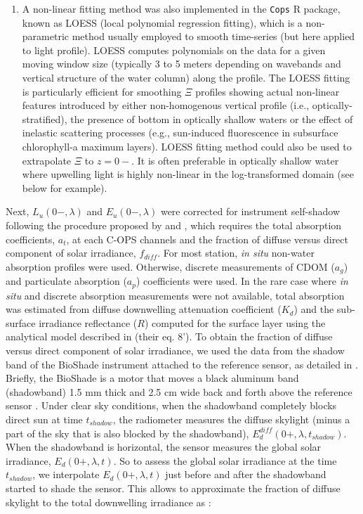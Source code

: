 \documentclass[essd, manuscript]{copernicus}
\begin{document}
\begin{enumerate}
    \item A non-linear fitting method was also implemented in the \texttt{Cops} R package, known as LOESS (local polynomial regression fitting), which is a non-parametric method usually employed to smooth time-series (but here applied to light profile). LOESS computes polynomials on the data for a given moving window size (typically 3 to 5 meters depending on wavebands and vertical structure of the water column) along the profile. The LOESS fitting is particularly efficient for smoothing $\Xi$ profiles showing actual non-linear features introduced by either non-homogenous vertical profile (i.e., optically-stratified), the presence of bottom in optically shallow waters or the effect of inelastic scattering processes (e.g., sun-induced fluorescence in subsurface chlorophyll-a maximum layers).  LOESS fitting method could also be used to extrapolate $\Xi$ to $z=0-$. It is often preferable in optically shallow water where upwelling light is highly non-linear in the log-transformed domain (see below for example).  
\end{enumerate}

Next, $L_u(0-,\lambda)$ and $E_u(0-,\lambda)$ were corrected for instrument self-shadow following the procedure proposed by \citet{Gordon1992b} and \citet{Zibordi1995}, which requires the total absorption coefficients, $a_t$, at each C-OPS channels and the fraction of diffuse versus direct component of solar irradiance, $f_{diff}$. For most station, \textit{in situ} non-water absorption profiles were used. Otherwise, discrete measurements of CDOM ($a_g$) and particulate absorption ($a_p$) coefficients were used. In the rare case where \textit{in situ} and discrete absorption measurements were not available, total absorption was estimated from diffuse downwelling attenuation coefficient ($K_d$) and the sub-surface irradiance reflectance ($R$) computed for the surface layer using the analytical model described in \citet{Morel2001} (their eq. 8'). To obtain the fraction of diffuse versus direct component of solar irradiance, we used the data from the shadow band of the BioShade instrument attached to the reference sensor, as detailed in \citet{Belanger2017}. 
Briefly, the BioShade is a motor that moves a black aluminum band (shadowband) 1.5 mm thick and  2.5 cm wide back and forth above the reference sensor \citet{Morrow2010}. 
Under clear sky conditions, when the shadowband completely blocks direct sun at time $t_{shadow}$, the radiometer measures the diffuse skylight (minus a part of the sky that is also blocked by the shadowband), $E_d^{diff}(0+,\lambda,t_{shadow})$. When the shadowband is horizontal, the sensor measures the global solar irradiance, $E_d(0+,\lambda,t)$. So to assess the global solar irradiance at the time $t_{shadow}$, we interpolate $E_d(0+,\lambda,t)$ just before and after the shadowband started to shade the sensor. This allows to approximate the fraction of diffuse skylight to the total downwelling irradiance as : 
\end{document}
